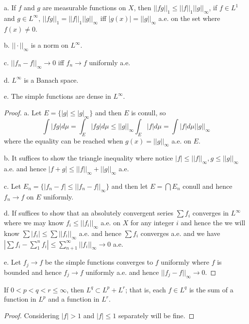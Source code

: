 \begin{theorem}
    a. If $f$ and $g$ are measurable functions on $X$, then $||fg||_1 \leq ||f||_1||g||_{\infty}$, if $f\in L^1$ and $g\in L^{\infty}$, $||fg||_1 = ||f||_1||g||_{\infty}$ iff $|g(x)| = ||g||_{\infty}$ a.e. on the set where $f(x) \neq 0$.\par
    b. $||\cdot||_{\infty}$ is a norm on $L^{\infty}$.\par
    c. $||f_n-f||_{\infty} \to 0$ iff $f_n\to f$ uniformly a.e.\par
    d. $L^{\infty}$ is a Banach space.\par
    e. The simple functions are dense in $L^{\infty}$.
\end{theorem}

\begin{proof}
    a. Let $E = \{|g|\leq |g|_{\infty}\}$ and then $E$ is conull, so
    \[
    \int |fg| d\mu = \int_E |fg| d\mu \leq ||g||_{\infty} \int_E |f| d\mu = \int |f|d\mu ||g||_{\infty}
    \]
    where the equality can be reached when $g(x) = ||g||_{\infty}$ a.e. on $E$.\par
    b. It suffices to show the triangle inequality where notice $|f|\leq ||f||_{\infty},g\leq ||g||_{\infty}$ a.e. and hence $|f+g| \leq ||f||_{\infty}+||g||_{\infty}$ a.e.\par
    c. Let $E_n = \{|f_n-f| \leq ||f_n-f||_{\infty}\}$ and then let $E = \bigcap E_n$ conull and hence $f_n\to f$ on $E$ uniformly.\par
    d. If suffices to show that an absolutely convergent series $\sum f_i$ converges in $L^{\infty}$ where we may know $f_i \leq ||f_i||_{\infty}$ a.e. on $X$ for any integer $i$ and hence the we will know $\sum|f_i| \leq \sum ||f_i||_{\infty}$ a.e. and hence $\sum f_i$ converges a.e. and we have $|\sum f_i - \sum_1^n f_i| \leq \sum_{n+1}^{\infty} ||f_i||_{\infty} \to 0$ a.e.\par
    e. Let $f_j \to f$ be the simple functions converges to $f$ uniformly where $f$ is bounded and hence $f_j\to f$ uniformly a.e. and hence $||f_j - f||_{\infty} \to 0$. 
\end{proof}

\begin{proposition}
    If $0<p<q<r\leq \infty$, then $L^q \subset L^p + L^r$; that is, each $f\in L^q$ is the sum of a function in $L^p$ and a function in $L^r$. 
\end{proposition}
\begin{proof}\par
    Considering $|f|>1$ and $|f|\leq 1$ separately will be fine.
\end{proof}


